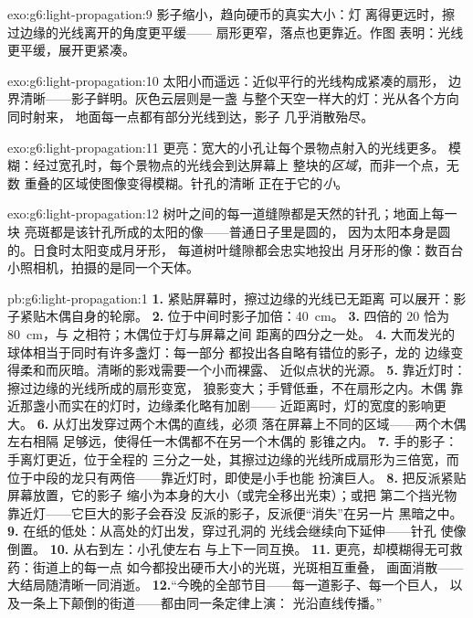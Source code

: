 \begin{solution}{exo:g6:light-propagation:9}
影子缩小，趋向硬币的真实大小：灯
离得更远时，擦过边缘的光线离开的角度更平缓——
扇形更窄，落点也更靠近。作图
表明：光线更平缓，展开更紧凑。
\end{solution}

\begin{solution}{exo:g6:light-propagation:10}
太阳小而遥远：近似平行的光线构成紧凑的扇形，
边界清晰——影子鲜明。灰色云层则是一盏
与整个天空一样大的灯：光从各个方向同时射来，
地面每一点都有部分光线到达，影子
几乎消散殆尽。
\end{solution}

\begin{solution}{exo:g6:light-propagation:11}
更亮：宽大的小孔让每个景物点射入的光线更多。
模糊：经过宽孔时，每个景物点的光线会到达屏幕上
整块的\emph{区域}，而非一个点，无数
重叠的区域使图像变得模糊。针孔的清晰
正在于它的\emph{小}。
\end{solution}

\begin{solution}{exo:g6:light-propagation:12}
树叶之间的每一道缝隙都是天然的针孔；地面上每一块
亮斑都是该针孔所成的太阳的像——普通日子里是圆的，
因为太阳本身是圆的。日食时太阳变成月牙形，
每道树叶缝隙都会忠实地投出
月牙形的像：数百台小照相机，拍摄的是同一个天体。
\end{solution}

\begin{solution}{pb:g6:light-propagation:1}
\textbf{1.} 紧贴屏幕时，擦过边缘的光线已无距离
可以展开：影子紧贴木偶自身的轮廓。
\textbf{2.} 位于中间时影子加倍：\qty{40}{cm}。
\textbf{3.} 四倍的 $20$ 恰为 \qty{80}{cm}，与
之相符；木偶位于灯与屏幕之间
距离的四分之一处。
\textbf{4.} 大而发光的球体相当于同时有许多盏灯：每一部分
都投出各自略有错位的影子，龙的
边缘变得柔和而灰暗。清晰的影戏需要一个小而裸露、
近似点状的光源。
\textbf{5.} 靠近灯时：擦过边缘的光线所成的扇形变宽，
狼影变大；手臂低垂，不在扇形之内。木偶
靠近那盏小而实在的灯时，边缘柔化略有加剧——
近距离时，灯的宽度的影响更大。
\textbf{6.} 从灯出发穿过两个木偶的直线，必须
落在屏幕上不同的区域——两个木偶左右相隔
足够远，使得任一木偶都不在另一个木偶的
影锥之内。
\textbf{7.} 手的影子：手离灯更近，位于全程的
三分之一处，其擦过边缘的光线所成扇形为三倍宽，而
位于中段的龙只有两倍——靠近灯时，即使是小手也能
扮演巨人。
\textbf{8.} 把反派紧贴屏幕放置，它的影子
缩小为本身的大小（或完全移出光束）；或把
第二个挡光物靠近灯——它巨大的影子会吞没
反派的影子，反派便“消失”在另一片
黑暗之中。
\textbf{9.} 在纸的低处：从高处的灯出发，穿过孔洞的
光线会继续向下延伸——针孔
使像倒置。
\textbf{10.} 从右到左：小孔使左右
与上下一同互换。
\textbf{11.} 更亮，却模糊得无可救药：街道上的每一点
如今都投出硬币大小的光斑，光斑相互重叠，
画面消散——大结局随清晰一同消逝。
\textbf{12.}“今晚的全部节目——每一道影子、每一个巨人，
以及一条上下颠倒的街道——都由同一条定律上演：
光沿直线传播。”
\end{solution}
